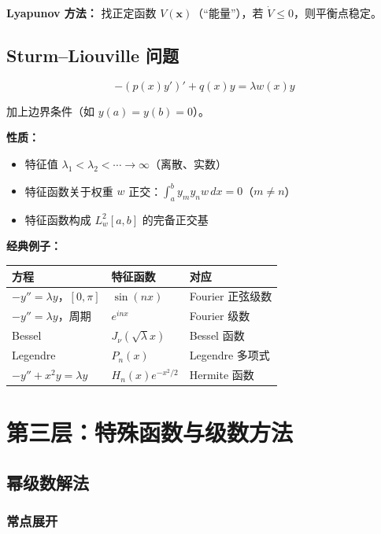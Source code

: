\textbf{Lyapunov 方法：} 找正定函数 $V(\mathbf{x})$（“能量”），若 $\dot{V} \leq 0$，则平衡点稳定。

\subsection{Sturm--Liouville 问题}

\[
-(p(x)y')' + q(x)y = \lambda w(x)y
\]

加上边界条件（如 $y(a) = y(b) = 0$）。

\textbf{性质：}
\begin{itemize}
  \item 特征值 $\lambda_1 < \lambda_2 < \cdots \to \infty$（离散、实数）
  \item 特征函数关于权重 $w$ 正交：$\int_a^b y_m y_n w\,dx = 0$（$m \neq n$）
  \item 特征函数构成 $L^2_w[a,b]$ 的完备正交基
\end{itemize}

\textbf{经典例子：}

\begin{center}
\begin{tabular}{L{4cm}L{3cm}L{4cm}}
\toprule
\textbf{方程} & \textbf{特征函数} & \textbf{对应} \\
\midrule
$-y'' = \lambda y$，$[0,\pi]$ & $\sin(nx)$ & Fourier 正弦级数 \\
$-y'' = \lambda y$，周期 & $e^{inx}$ & Fourier 级数 \\
Bessel & $J_\nu(\sqrt{\lambda}x)$ & Bessel 函数 \\
Legendre & $P_n(x)$ & Legendre 多项式 \\
$-y'' + x^2 y = \lambda y$ & $H_n(x)e^{-x^2/2}$ & Hermite 函数 \\
\bottomrule
\end{tabular}
\end{center}

\section{第三层：特殊函数与级数方法}

\subsection{幂级数解法}

\subsubsection{常点展开}

